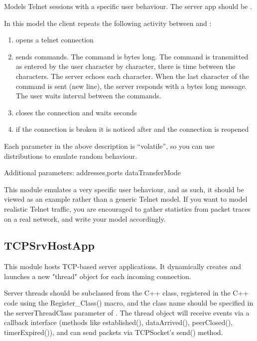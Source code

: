 Models Telnet sessions with a specific user behaviour.
The server app should be .

In this model the client repeats the following activity
between  and :

\begin{enumerate}
\item opens a telnet connection
\item sends  commands. The command is  bytes
      long. The command is transmitted as entered by the user character by character,
      there is  time between the characters. The server echoes
      each character. When the last character of the command is sent (new line),
      the server responds with a  bytes long message.
      The user waits  interval between the commands.
\item closes the connection and waits  seconds
\item if the connection is broken it is noticed after 
      and the connection is reopened
\end{enumerate}

Each parameter in the above description is ``volatile'', so you can
use distributions to emulate random behaviour.

Additional parameters:
addresses,ports
dataTransferMode

\begin{note}
This module emulates a very specific user behaviour, and as such,
it should be viewed as an example rather than a generic Telnet model.
If you want to model realistic Telnet traffic, you are encouraged
to gather statistics from packet traces on a real network, and
write your model accordingly.
\end{note}

\subsection{TCPSrvHostApp}

This module hosts TCP-based server applications. It dynamically creates
and launches a new "thread" object for each incoming connection.

Server threads should be subclassed from the 
C++ class, registered in the C++ code using the Register\_Class() macro,
and the class name should be specified in the serverThreadClass
parameter of . The thread object will receive events
via a callback interface (methods like established(), dataArrived(),
peerClosed(), timerExpired()), and can send packets via TCPSocket's send()
method.

